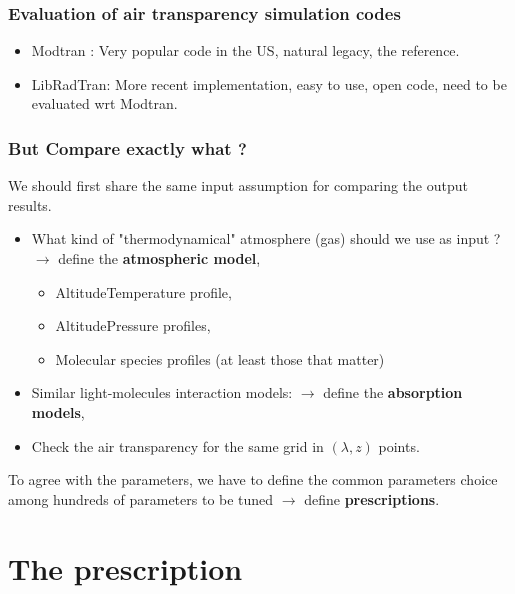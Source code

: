 \documentclass{beamer}
\begin{document}
\begin{frame}
\frametitle{Evaluation of air transparency simulation codes}
\begin{itemize}
\item Modtran : Very popular code in the US, natural legacy, the reference. 
\item LibRadTran: More recent implementation, easy to use, open code, need to be evaluated wrt Modtran.
\end{itemize}
\end{frame}


\begin{frame}
\frametitle{But Compare exactly what ?}
We should first share the same input assumption for comparing the output results.
\begin{itemize}
\item What kind of "thermodynamical" atmosphere (gas) should we use as input  ?  $\rightarrow$ define the \textbf{atmospheric model},
\begin{itemize}
\item AltitudeTemperature profile, 
\item AltitudePressure profiles,
\item Molecular species profiles (at least those that matter)
\end{itemize}
\item Similar light-molecules interaction models: $\rightarrow$ define the \textbf{absorption models},
\item Check the air transparency for the same grid in $(\lambda,z)$ points.
\end{itemize}
To agree with the parameters, we have to define the common parameters choice among hundreds of parameters to be tuned $\rightarrow$ define \textbf{prescriptions}.
\end{frame}


\section{The prescription}
\end{document}
